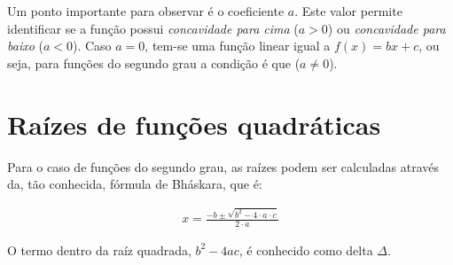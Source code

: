 \vspace{.5cm}

Um ponto importante para observar é o coeficiente $a$. Este valor permite identificar se a função possui \textit{concavidade para cima} ($a>0$) ou \textit{concavidade para baixo} ($a<0$). Caso $a=0$, tem-se uma função linear igual a $f(x)=bx+c$, ou seja, para funções do segundo grau a condição é que ($a \ne 0$).

\section{Raízes de funções quadráticas}

Para o caso de funções do segundo grau, as raízes podem ser calculadas através da, tão conhecida, fórmula de Bháskara, que é:

\begin{ceqn}
	\begin{align*}
	x = \frac{-b \pm \sqrt{b^2-4\cdot a \cdot c}}{2\cdot a}
	\end{align*}
\end{ceqn}

O termo dentro da raíz quadrada, $b^2-4ac$, é conhecido como delta $\Delta$.

